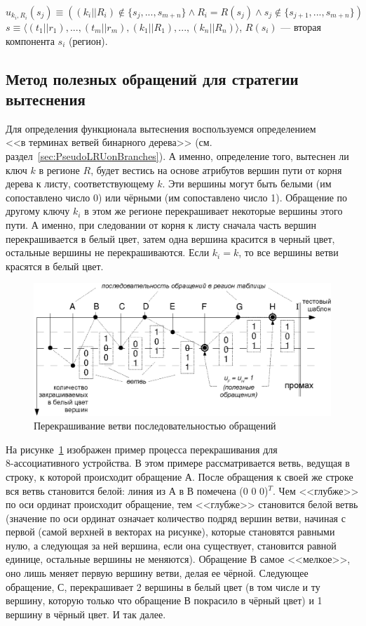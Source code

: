 $$u_{k_i,R_i}(s_j) \equiv ((k_i||R_i) \notin \{s_j, ..., s_{m+n}\} \wedge R_i = R(s_j) \wedge s_j \notin\{s_{j+1},..., s_{m+n}\})$$
$s \equiv \langle (t_1||r_1), ..., (t_m||r_m), (k_1||R_1), ..., (k_n||R_n)\rangle$, $R(s_i)$ --- вторая компонента $s_i$ (регион).


\subsection{Метод полезных обращений для стратегии вытеснения \PseudoLRU}

Для определения функционала вытеснения воспользуемся определением\\\PseudoLRU <<в терминах ветвей бинарного дерева>> (см. раздел~\ref{sec:PseudoLRUonBranches}). А именно, определение того, вытеснен ли ключ $k$ в регионе $R$, будет вестись на основе атрибутов вершин пути от корня дерева к  листу, соответствующему $k$. Эти вершины могут быть белыми (им сопоставлено число 0) или чёрными (им сопоставлено число 1). Обращение по другому ключу $k_i$ в этом же регионе перекрашивает некоторые вершины этого пути. А именно, при следовании от корня к листу сначала часть вершин перекрашивается в белый цвет, затем одна вершина красится в черный цвет, остальные вершины не перекрашиваются. Если $k_i = k$, то все вершины ветви красятся в белый цвет.

  \begin{figure}[h] \center
  \includegraphics[width=\textwidth]{2.theor/plru_usefl_exmp}
  \caption{Перекрашивание ветви последовательностью обращений}\label{fig:plru_exmp_vytesn}
  \end{figure}

На рисунке~\ref{fig:plru_exmp_vytesn} изображен пример процесса перекрашивания для \\8-ассоциативного устройства. В этом примере рассматривается ветвь, ведущая в строку, к которой происходит обращение А. После обращения к своей же строке вся ветвь становится белой: линия из А в В помечена (0 0 0)$^T$. Чем <<глубже>> по оси ординат происходит обращение, тем <<глубже>> становится белой ветвь (значение по оси ординат означает количество подряд вершин ветви, начиная с первой (самой верхней в векторах на рисунке), которые становятся равными нулю, а следующая за ней вершина, если она существует, становится равной единице, остальные вершины не меняются). Обращение В самое <<мелкое>>, оно лишь меняет первую вершину ветви, делая ее чёрной. Следующее обращение, С, перекрашивает 2 вершины в белый цвет (в том числе и ту вершину, которую только что обращение В покрасило в чёрный цвет) и 1 вершину в чёрный цвет. И так далее.

